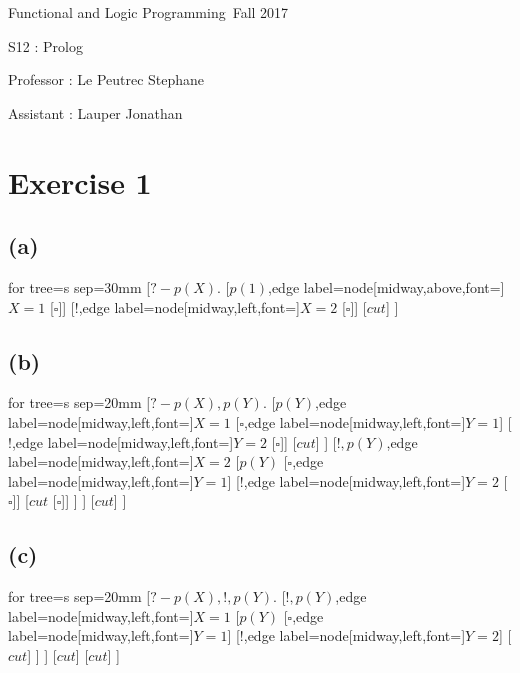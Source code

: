 \documentclass[a4paper,11pt]{report}
\author{Sylvain Julmy}
\date{\today}
\newcommand*{\equal}{=}
\newcommand*{\disj}{,}
\begin{document}
\begin{center}
  \Large{
    Functional and Logic Programming\
    Fall 2017
  }
  
  \noindent\makebox[\linewidth]{\rule{\linewidth}{0.4pt}}
  S12 : Prolog
  \noindent\makebox[\linewidth]{\rule{\linewidth}{0.4pt}}

  \begin{flushleft}
    Professor : Le Peutrec Stephane
    
    Assistant : Lauper Jonathan
  \end{flushleft}

  \noindent\makebox[\linewidth]{\rule{\textwidth}{1pt}}
\end{center}

\section*{Exercise 1}

\subsection*{(a)}
\begin{forest}
  for tree={s sep=30mm}
  [$?- p(X).$
  [$p(1)$,edge label={node[midway,above,font=\scriptsize]{$X \equal 1$}}
  [$\square$]]
  [$!$,edge label={node[midway,left,font=\scriptsize]{$X \equal 2$}}
  [$\square$]]
  [$cut$]
  ]
\end{forest}

\subsection*{(b)}
\begin{forest}
  for tree={s sep=20mm}
  [$?- p(X) \disj p(Y).$
  [$ p(Y) $,edge label={node[midway,left,font=\scriptsize]{$X \equal 1$}}
  [$\square$,edge label={node[midway,left,font=\scriptsize]{$Y \equal 1$}}]
  [$!$,edge label={node[midway,left,font=\scriptsize]{$Y \equal 2$}} [$\square$]]
  [$cut$]
  ]
  [$ ! \disj p(Y) $,edge label={node[midway,left,font=\scriptsize]{$X \equal2$}}
  [$p(Y)$
  [$\square$,edge label={node[midway,left,font=\scriptsize]{$Y \equal 1$}}]
  [$!$,edge label={node[midway,left,font=\scriptsize]{$Y \equal 2$}} [$\square$]]
  [$cut$
  [$\square$]]
  ]
  ]
  [$cut$]
  ]
\end{forest}

\subsection*{(c)}
\begin{forest}
  for tree={s sep=20mm}
  [$?- p(X) \disj ! \disj p(Y).$
  [$ ! \disj p(Y) $,edge label={node[midway,left,font=\scriptsize]{$X \equal 1$}}
  [$p(Y)$
  [$\square$,edge label={node[midway,left,font=\scriptsize]{$Y \equal 1$}}]
  [$!$,edge label={node[midway,left,font=\scriptsize]{$Y \equal 2$}}]
  [$cut$]
  ]
  ]
  [$cut$]
  [$cut$]
  ]
\end{forest}
\end{document}
